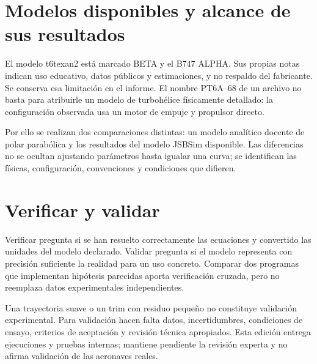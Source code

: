 \section{Modelos disponibles y alcance de sus resultados}
El modelo t6texan2 está marcado BETA y el B747 ALPHA. Sus propias notas indican uso educativo, datos públicos y estimaciones, y no respaldo del fabricante. Se conserva esa limitación en el informe. El nombre PT6A--68 de un archivo no basta para atribuirle un modelo de turbohélice físicamente detallado: la configuración observada usa un motor de empuje y propulsor directo.

Por ello se realizan dos comparaciones distintas: un modelo analítico docente de polar parabólica y los resultados del modelo JSBSim disponible. Las diferencias no se ocultan ajustando parámetros hasta igualar una curva; se identifican las físicas, configuración, convenciones y condiciones que difieren.

\section{Verificar y validar}
Verificar pregunta si se han resuelto correctamente las ecuaciones y convertido las unidades del modelo declarado. Validar pregunta si el modelo representa con precisión suficiente la realidad para un uso concreto. Comparar dos programas que implementan hipótesis parecidas aporta verificación cruzada, pero no reemplaza datos experimentales independientes.

Una trayectoria suave o un trim con residuo pequeño no constituye validación experimental. Para validación hacen falta datos, incertidumbres, condiciones de ensayo, criterios de aceptación y revisión técnica apropiados. Esta edición entrega ejecuciones y pruebas internas; mantiene pendiente la revisión experta y no afirma validación de las aeronaves reales.



